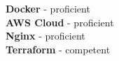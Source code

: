 \documentclass[9pt]{developercv} %
\begin{document}
\hfill
\begin{minipage}[t]{0.3\textwidth}
	\vspace{-\baselineskip} %
	
	\textbf{Docker} - proficient\\
	\textbf{AWS Cloud} - proficient\\
	\textbf{Nginx} - proficient\\
	\textbf{Terraform} - competent\\
\end{minipage}
\end{document}
